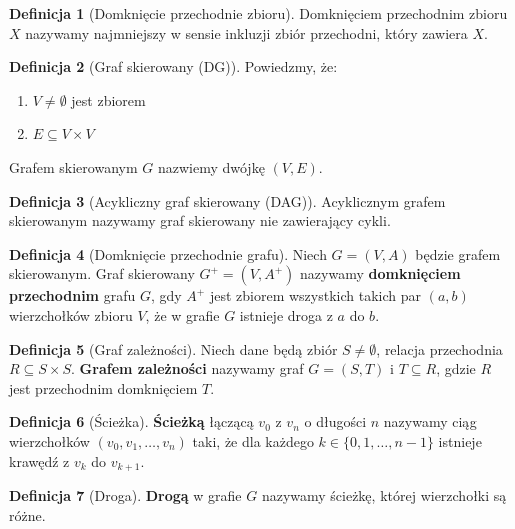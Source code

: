 \documentclass[a4paper,oneside,leqno,12pt]{book}
\theoremstyle{definition}
\newtheorem{definicja}{Definicja}[chapter]
\theoremstyle{plain}
\theoremstyle{remark}
\begin{document}
\begin{definicja}[Domknięcie przechodnie zbioru]\label{def:transitive_closure_set}
Domknięciem przechodnim zbioru \(X\) nazywamy najmniejszy w sensie inkluzji zbiór przechodni, który zawiera \(X\).
\end{definicja}

\begin{definicja}[Graf skierowany (DG)]\label{def:DG}
Powiedzmy, że:
\begin{enumerate}
\item \(V\neq\emptyset\) jest zbiorem
\item \( E \subseteq V \times V \)
\end{enumerate}
Grafem skierowanym \(G\) nazwiemy dwójkę \((V, E)\).
\end{definicja}

\begin{definicja}[Acykliczny graf skierowany (DAG)]\label{def:dag}
Acyklicznym grafem skierowanym nazywamy graf skierowany nie zawierający cykli.
\end{definicja}

\begin{definicja}[Domknięcie przechodnie grafu]\label{def:domk_przechodnie_grafu}
Niech \(G=(V,A)\) będzie grafem skierowanym. Graf skierowany \(G^+=(V,A^{+})\) nazywamy \textbf{domknięciem przechodnim} grafu \(G\), gdy \(A^{+}\) jest zbiorem wszystkich takich par \((a,b)\) wierzchołków zbioru \(V\), że w grafie \(G\) istnieje droga z \(a\) do \(b\).
\end{definicja}

\begin{definicja}[Graf zależności]\label{def:depend_graph}
Niech dane będą zbiór \(S\neq\emptyset\), relacja przechodnia \(R\subseteq S\times S\). \textbf{Grafem zależności} nazywamy graf \(G=(S,T)\) i \(T\subseteq R\), gdzie \(R\) jest przechodnim domknięciem \(T\).
\end{definicja}


\begin{definicja}[Ścieżka]\label{def:sciezka}
\textbf{Ścieżką} łączącą \(v_0\) z \(v_n\) o długości \(n\) nazywamy ciąg wierzchołków \((v_0, v_1, \dots, v_n)\) taki, że dla każdego \(k\in \{0, 1, \dots, n-1\}\) istnieje krawędź z \(v_k\) do \(v_{k+1}\).
\end{definicja}

\begin{definicja}[Droga]\label{def:droga}
\textbf{Drogą} w grafie \(G\) nazywamy ścieżkę, której wierzchołki są różne.
\end{definicja}
\end{document}
